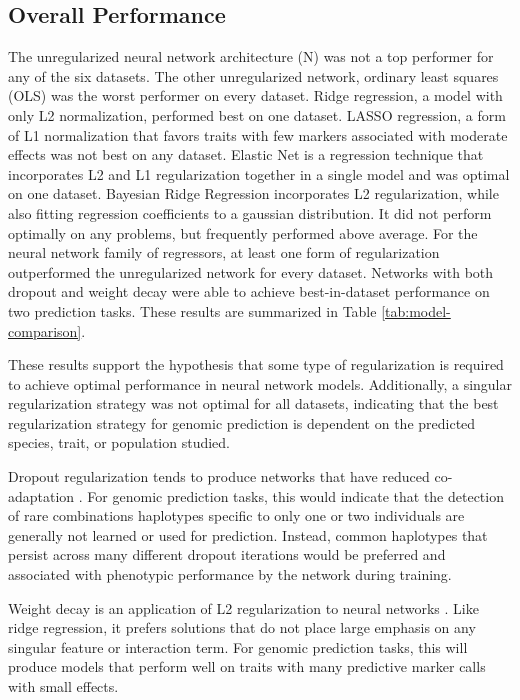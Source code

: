 
\subsection*{Overall Performance}

The unregularized neural network architecture (N) was not a top performer for 
any of the six datasets. The other unregularized network, ordinary least 
squares (OLS) was the worst performer on every dataset. Ridge regression, 
a model with only L2 normalization, performed best on one dataset. 
LASSO regression, a form of L1 normalization that favors traits with few 
markers associated with moderate effects was not best on any dataset. 
Elastic Net is a regression technique that incorporates L2 and L1 
regularization together in a single model and was optimal on one dataset. 
Bayesian Ridge Regression incorporates L2 regularization, while also fitting 
regression coefficients to a gaussian distribution. It did not perform optimally 
on any problems, but frequently performed above average. For the neural 
network family of regressors, at least one form of regularization 
outperformed the unregularized network for every dataset. Networks with 
both dropout and weight decay were able to achieve best-in-dataset 
performance on two prediction tasks. These results are summarized 
in Table \ref{tab:model-comparison}.

These results support the hypothesis that some type of regularization 
is required to achieve optimal performance in neural network models. 
Additionally, a singular regularization strategy was not optimal for 
all datasets, indicating that the best regularization strategy for 
genomic prediction is dependent on the predicted species, trait, 
or population studied. 

Dropout regularization tends to produce networks 
that have reduced co-adaptation \citep{srivastava2014}. For genomic prediction 
tasks, this would indicate that the detection of rare combinations haplotypes 
specific to only one or two individuals are generally not learned or used for 
prediction. Instead, common haplotypes that persist across many different 
dropout iterations would be preferred and associated with phenotypic 
performance by the network during training.

Weight decay is an application of L2 regularization to neural networks 
\citep{krogh1992}. Like ridge regression, it prefers solutions that do not place 
large emphasis on any singular feature or interaction term. For genomic 
prediction tasks, this will produce models that perform well on traits 
with many predictive marker calls with small effects. 


